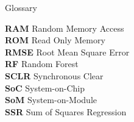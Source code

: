 \begin{preface}{Glossary}
  
  
  \textbf{RAM} Random Memory Access\\
  
 
  \textbf{ROM} Read Only Memory\\
  
  \textbf{RMSE} Root Mean Square Error\\
  
  \textbf{RF} Random Forest\\
  
  \textbf{SCLR} Synchronous Clear\\
  
  \textbf{SoC} System-on-Chip\medskip\\
  
  \textbf{SoM} System-on-Module\medskip\\
  
  \textbf{SSR} Sum of Squares Regression\medskip\medskip\\
\end{preface}
